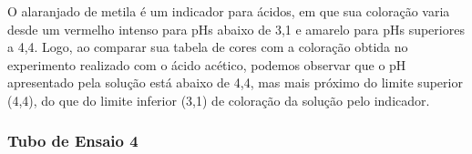 \begin{figure}[h]
            \label{fig:experimento12}
        \end{figure}
    	
    	\indent O alaranjado de metila é um indicador para ácidos, em que sua coloração varia desde um vermelho intenso para pHs abaixo de 3,1 e amarelo para pHs superiores a 4,4. Logo, ao comparar sua tabela de cores com a coloração obtida no experimento realizado com o ácido acético, podemos observar que o pH apresentado pela solução está abaixo de 4,4, mas mais próximo do limite superior (4,4), do que do limite inferior (3,1) de coloração da solução pelo indicador.\\

	\newpage
	\subsubsection{Tubo de Ensaio 4}

